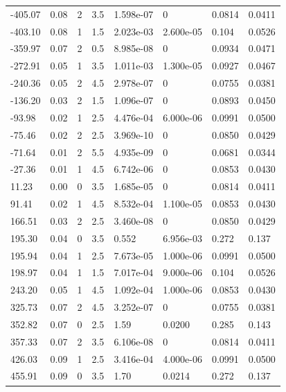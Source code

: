 \documentclass[preview]{standalone}
\begin{document}
{{\begin{tabular}{L{1.2cm}C{1.2cm} C{0.3cm}C{0.5cm} C{1.4cm}C{1.4cm} C{1.4cm}C{1.4cm}}
  -405.07  &  0.08  & 2     & 3.5 &  1.598e-07  & 0  & 0.0814 &  0.0411   \\ 
  -403.10  &  0.08  & 1     & 1.5 &  2.023e-03  & 2.600e-05  & 0.104 &  0.0526   \\ 
  -359.97  &  0.07  & 2     & 0.5 &  8.985e-08  & 0  & 0.0934 &  0.0471   \\ 
  -272.91  &  0.05  & 1     & 3.5 &  1.011e-03  & 1.300e-05  & 0.0927 &  0.0467   \\ 
  -240.36  &  0.05  & 2     & 4.5 &  2.978e-07  & 0  & 0.0755 &  0.0381   \\ 
  -136.20  &  0.03  & 2     & 1.5 &  1.096e-07  & 0  & 0.0893 &  0.0450   \\ 
  -93.98  &  0.02  & 1     & 2.5 &  4.476e-04  & 6.000e-06  & 0.0991 &  0.0500   \\ 
  -75.46  &  0.02  & 2     & 2.5 &  3.969e-10  & 0  & 0.0850 &  0.0429   \\ 
  -71.64  &  0.01  & 2     & 5.5 &  4.935e-09  & 0  & 0.0681 &  0.0344   \\ 
  -27.36  &  0.01  & 1     & 4.5 &  6.742e-06  & 0  & 0.0853 &  0.0430   \\ 
  11.23  &  0.00  & 0     & 3.5 &  1.685e-05  & 0  & 0.0814 &  0.0411   \\ 
  91.41  &  0.02  & 1     & 4.5 &  8.532e-04  & 1.100e-05  & 0.0853 &  0.0430   \\ 
  166.51  &  0.03  & 2     & 2.5 &  3.460e-08  & 0  & 0.0850 &  0.0429   \\ 
  195.30  &  0.04  & 0     & 3.5 &  0.552  & 6.956e-03  & 0.272 &  0.137   \\ 
  195.94  &  0.04  & 1     & 2.5 &  7.673e-05  & 1.000e-06  & 0.0991 &  0.0500   \\ 
  198.97  &  0.04  & 1     & 1.5 &  7.017e-04  & 9.000e-06  & 0.104 &  0.0526   \\ 
  243.20  &  0.05  & 1     & 4.5 &  1.092e-04  & 1.000e-06  & 0.0853 &  0.0430   \\ 
  325.73  &  0.07  & 2     & 4.5 &  3.252e-07  & 0  & 0.0755 &  0.0381   \\ 
  352.82  &  0.07  & 0     & 2.5 &  1.59  & 0.0200  & 0.285 &  0.143   \\ 
  357.33  &  0.07  & 2     & 3.5 &  6.106e-08  & 0  & 0.0814 &  0.0411   \\ 
  426.03  &  0.09  & 1     & 2.5 &  3.416e-04  & 4.000e-06  & 0.0991 &  0.0500   \\ 
  455.91  &  0.09  & 0     & 3.5 &  1.70  & 0.0214  & 0.272 &  0.137   \\ 

\end{tabular}}}
\end{document}
